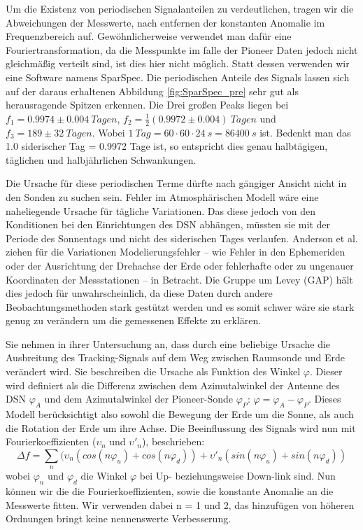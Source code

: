 Um die Existenz von periodischen Signalanteilen zu verdeutlichen, tragen wir die Abweichungen der Messwerte, nach entfernen der konstanten Anomalie im Frequenzbereich auf. Gewöhnlicherweise verwendet man dafür eine Fouriertransformation, da die Messpunkte im falle der Pioneer Daten jedoch nicht gleichmäßig verteilt sind, ist dies hier nicht möglich. Statt dessen verwenden wir eine Software namens SparSpec.
Die periodischen Anteile des Signals lassen sich auf der daraus erhaltenen Abbildung \ref{fig:SparSpec_pre} sehr gut als herausragende Spitzen erkennen.
Die Drei großen Peaks liegen bei $f_1=0.9974\pm0.004\ Tagen$, $f_2=\frac12(0.9972\pm0.004)\ Tagen$ und 
$f_3=189\pm32\ Tagen$. Wobei $ 1\ Tag = 60 \cdot 60 \cdot 24 \:s = 86400\:s$ ist.
Bedenkt man das 1.0 siderischer Tag = 0.9972 Tage ist, so entspricht dies genau halbtägigen, täglichen und halbjährlichen Schwankungen.

Die Ursache für diese periodischen Terme dürfte nach gängiger Ansicht nicht in den Sonden zu suchen sein. Fehler im Atmosphärischen Modell wäre eine naheliegende Ursache für tägliche Variationen. Das diese jedoch von den Konditionen bei den Einrichtungen des DSN abhängen, müssten sie mit der Periode des Sonnentags und nicht des siderischen Tages verlaufen.\cite{Levy2009}
Anderson et al. ziehen für die Variationen Modelierungsfehler – wie Fehler in den Ephemeriden oder der Ausrichtung der Drehachse der Erde oder fehlerhafte oder zu ungenauer Koordinaten der Messstationen – in Betracht.\cite{Levy2009}\cite{Dittus2006} %
Die Gruppe um Levey (GAP) hält dies jedoch für unwahrscheinlich, da diese Daten durch andere Beobachtungsmethoden
stark gestützt werden und es somit schwer wäre sie stark genug zu verändern um die gemessenen Effekte zu erklären.

Sie nehmen in ihrer Untersuchung an, dass durch eine beliebige Ursache die Ausbreitung des Tracking-Signals auf
dem Weg zwischen Raumsonde und Erde verändert wird. Sie beschreiben die Ursache als Funktion des Winkel $\varphi$. Dieser wird definiert als die Differenz zwischen dem Azimutalwinkel der Antenne des DSN $\varphi_A$ und dem Azimutalwinkel der Pioneer-Sonde $\varphi_P$: $\varphi=\varphi_A-\varphi_P$. %
Dieses Modell berücksichtigt also sowohl die Bewegung der Erde um die Sonne, als auch die Rotation der Erde um ihre Achse.
Die Beeinflussung des Signals wird nun mit Fourierkoeffizienten ($\upsilon_n$ und $\upsilon'_n$), beschrieben:
\begin{equation}
\Delta f = \sum_n (\upsilon_n(cos(n\varphi_u)+cos(n\varphi_d))+\upsilon'_n(sin(n\varphi_u)+sin(n\varphi_d))
\end{equation}
wobei $\varphi_u$ und $\varphi_d$ die Winkel $\varphi$ bei Up- beziehungsweise Down-link sind.
Nun können wir die die Fourierkoeffizienten, sowie die konstante Anomalie an die Messwerte fitten. Wir verwenden dabei n = 1 und 2, das hinzufügen von höheren Ordnungen bringt keine nennenswerte Verbesserung.

